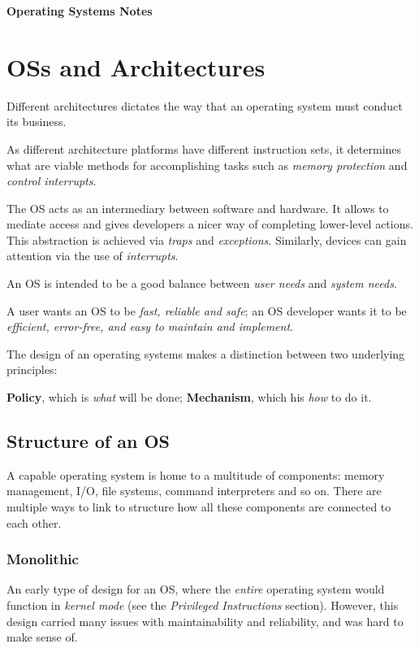 \documentclass{article}
\begin{document}
\textbf{\Huge Operating Systems Notes}

\section{OSs and Architectures}

Different architectures dictates the way that an operating system must conduct its business.

As different architecture platforms have different instruction sets, it determines what are viable methods for accomplishing tasks such as \textit{memory protection} and \textit{control interrupts}.

The OS acts as an intermediary between software and hardware. It allows to mediate access and gives developers a nicer way of completing lower-level actions. This abstraction is achieved via \textit{traps} and \textit{exceptions}. Similarly, devices can gain attention via the use of \textit{interrupts}.

An OS is intended to be a good balance between \textit{user needs} and \textit{system needs}.

A user wants an OS to be \textit{fast, reliable and safe}; an OS developer wants it to be \textit{efficient, error-free, and easy to maintain and implement}.

The design of an operating systems makes a distinction between two underlying principles:

\textbf{Policy}, which is \textit{what} will be done; \textbf{Mechanism}, which his \textit{how} to do it.

\subsection{Structure of an OS}

A capable operating system is home to a multitude of components: memory management, I/O, file systems, command interpreters and so on. There are multiple ways to link to structure how all these components are connected to each other.

\subsubsection{Monolithic}

An early type of design for an OS, where the \textit{entire} operating system would function in \textit{kernel mode} (see the \textit{Privileged Instructions} section). However, this design carried many issues with maintainability and reliability, and was hard to make sense of.
\end{document}
